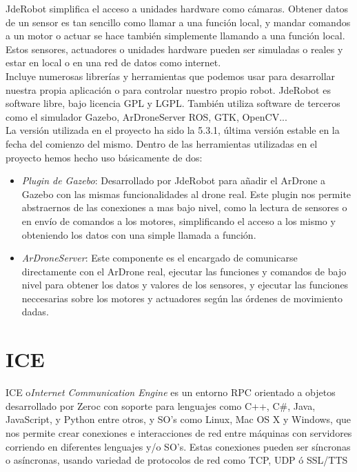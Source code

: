 JdeRobot simplifica el acceso a unidades hardware como cámaras. Obtener datos de un sensor es tan sencillo como llamar a una función local, y mandar comandos a un motor o actuar se hace también simplemente llamando a una función local. Estos sensores, actuadores o unidades hardware pueden ser simuladas o reales y estar en local o en una red de datos como internet.\\

Incluye numerosas librerías y herramientas que podemos usar para desarrollar nuestra propia aplicación o para controlar nuestro propio robot. JdeRobot es software libre, bajo licencia GPL y LGPL. También utiliza software de terceros como el simulador Gazebo, ArDroneServer ROS, GTK, OpenCV...\\

La versión utilizada en el proyecto ha sido la 5.3.1, última versión estable en la fecha del comienzo del mismo. Dentro de las herramientas utilizadas en el proyecto hemos hecho uso básicamente de dos:

\begin{itemize}
\item \emph{Plugin de Gazebo}: Desarrollado por JdeRobot para añadir el ArDrone a Gazebo con las mismas funcionalidades al drone real. Este plugin nos permite abstraernos de las conexiones a mas bajo nivel, como la lectura de sensores o en envío de comandos a los motores, simplificando el acceso a los mismo y obteniendo los datos con una simple llamada a función.
\item \emph{ArDroneServer}: Este componente es el encargado de comunicarse directamente con el ArDrone real, ejecutar las funciones y comandos de bajo nivel para obtener los datos y valores de los sensores, y ejecutar las funciones neccesarias sobre los motores y actuadores según las órdenes de movimiento dadas. 
\end{itemize}



\section{ICE}

ICE o\emph{Internet Communication Engine} es un entorno RPC orientado a objetos desarrollado por Zeroc con soporte para lenguajes como C++, C\#, Java, JavaScript, y Python entre otros, y SO's como Linux, Mac OS X y Windows, que nos permite crear conexiones e interacciones de red entre máquinas con servidores corriendo en diferentes lenguajes y/o SO's. Estas conexiones pueden ser síncronas o asíncronas, usando variedad de protocolos de red como TCP, UDP ó SSL/TTS\\

